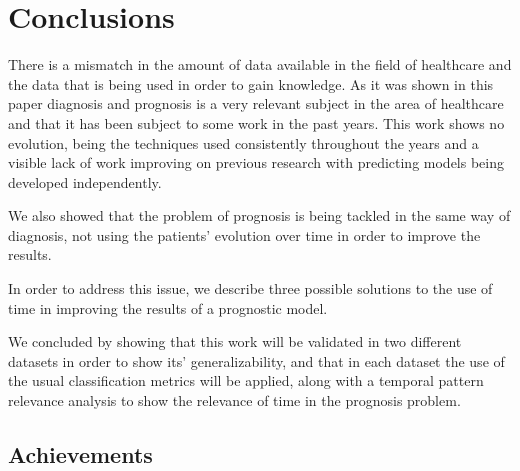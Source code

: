 
\chapter{Conclusions}
\label{chapter:conclusions}

There is a mismatch in the amount of data available in the field of healthcare and the data that is being used in order to gain knowledge.
 As it was shown in this paper diagnosis and prognosis is a very relevant subject in the area of healthcare and that it has been subject 
 to some work in the past years. This work shows no evolution, being the techniques used consistently throughout the years and a visible
 lack of work improving on previous research with predicting models being developed independently. 

We also showed that the problem of prognosis is being tackled in the same way of diagnosis, not using the patients’ evolution over time
 in order to improve the results. 

In order to address this issue, we describe three possible solutions to the use of time in improving the results of a prognostic model.

We concluded by showing that this work will be validated in two different datasets in order to show its’ generalizability, and that
in each dataset the use of the usual classification metrics will be applied, along with a temporal pattern relevance analysis to show
 the relevance of time in the prognosis problem.



\section{Achievements}
\label{section:achievements}

